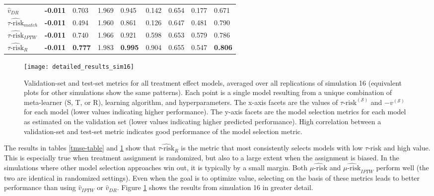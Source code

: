 \begin{table}[ht]
\begin{tabular}{lllllllll}
  $\hat v_{DR}$ & \bfseries{-0.011} & 0.703 & 1.969 & 0.945 & 0.142 & 0.654 & 0.177 & 0.671 \\ 
  $\widehat{\tau\text{-risk}}_{match}$ & \bfseries{-0.011} & 0.494 & 1.960 & 0.861 & 0.126 & 0.647 & 0.481 & 0.790 \\ 
  $\widehat{\tau\text{-risk}}_{IPTW}$ & \bfseries{-0.011} & 0.740 & 1.966 & 0.921 & 0.598 & 0.653 & 0.579 & 0.786 \\ 
  $\widehat{\tau\text{-risk}}_{R}$ & \bfseries{-0.011} & \bfseries{0.777} & 1.983 & \bfseries{0.995} & 0.904 & 0.655 & 0.547 & \bfseries{0.806} \\ 
   \hline
\end{tabular}
\label{value-table}
\end{table}

\begin{figure}
  \centering
    \texttt{[image: detailed\_results\_sim16]}
      \caption{Validation-set and test-set metrics for all treatment effect models, averaged over all replications of simulation 16 (equivalent plots for other simulations show the same patterns). Each point is a single model resulting from a unique combination of meta-learner (S, T, or R), learning algorithm, and hyperparameters. The x-axis facets are the values of $\tau\text{-risk}^{(\mathcal{S})}$ and $-v^{(\mathcal{S})}$ for each model (lower values indicating higher performance). The y-axis facets are the model selection metrics for each model as estimated on the validation set (lower values indicating higher predicted performance). High correlation between a validation-set and test-set metric indicates good performance of the model selection metric.}
      \label{details16}
\end{figure}

The results in tables \ref{tmse-table} and \ref{value-table} show that $\widehat{\tau\text{-risk}}_{R}$ is the metric that most consistently selects models with low $\tau\text{-risk}$ and high value. This is especially true when treatment assignment is randomized, but also to a large extent when the assignment is biased. In the simulations where other model selection approaches win out, it is typically by a small margin. Both $\widehat{\mu\text{-risk}}$ and $\widehat{\mu\text{-risk}}_{IPTW}$ perform well (the two are identical in randomized settings). Even when the goal is to optimize value, selecting on the basis of these metrics leads to better performance than using $\hat v_{IPTW}$ or $\hat v_{DR}$. Figure \ref{details16} shows the results from simulation 16 in greater detail.


